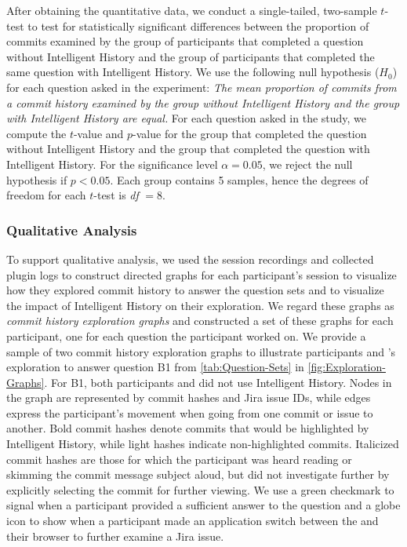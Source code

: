 After obtaining the quantitative data, we conduct a single-tailed, two-sample $t$-test to test for statistically significant differences 
between the proportion of commits examined by the group of participants that completed a question without Intelligent History and the group of participants 
that completed the same question with Intelligent History.
We use the following null hypothesis ($H_{0}$) for each question asked in the experiment: 
\textit{The mean proportion of commits from a commit history examined by the group without Intelligent History and the group with Intelligent History are equal.}
For each question asked in the study, we compute the $t$-value and $p$-value for the group that completed 
the question without Intelligent History and the group that completed the question with Intelligent History.
For the significance level $\alpha = 0.05$, we reject the null hypothesis if $p < 0.05$.
Each group contains 5 samples, hence the degrees of freedom for each $t$-test is \emph{df} $= 8$.

\subsubsection{Qualitative Analysis}

To support qualitative analysis, we used the session recordings and collected plugin logs to construct directed graphs 
for each participant's session to visualize how they explored commit history to answer the question sets 
and to visualize the impact of Intelligent History on their exploration.
We regard these graphs as \emph{commit history exploration graphs} and constructed a set of these graphs for each participant, 
one for each question the participant worked on.
We provide a sample of two commit history exploration graphs to illustrate 
participants  and ’s exploration to answer question B1 
from \autoref{tab:Question-Sets} in \autoref{fig:Exploration-Graphs}.
For B1, both participants  and  did not use Intelligent History.
Nodes in the graph are represented by commit hashes and Jira issue IDs, 
while edges express the participant's movement when going from one commit or issue to another.
Bold commit hashes denote commits that would be highlighted by Intelligent History, 
while light hashes indicate non-highlighted commits.
Italicized commit hashes are those for which the participant was heard reading or skimming the commit message subject aloud, 
but did not investigate further by explicitly selecting the commit for further viewing.
We use a green checkmark to signal when a participant provided a sufficient answer to the question 
and a globe icon to show when a participant made an application switch between the  
and their browser to further examine a Jira issue.

